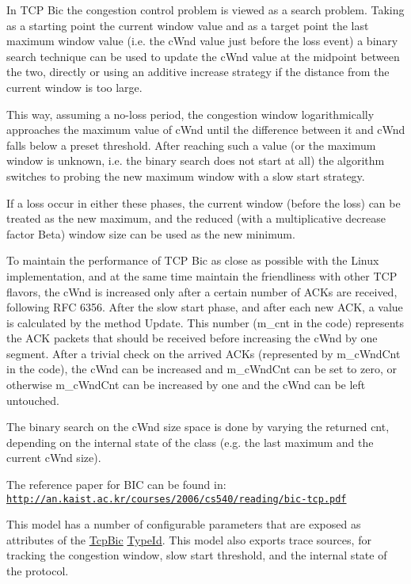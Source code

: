In T\+CP Bic the congestion control problem is viewed as a search problem. Taking as a starting point the current window value and as a target point the last maximum window value (i.\+e. the c\+Wnd value just before the loss event) a binary search technique can be used to update the c\+Wnd value at the midpoint between the two, directly or using an additive increase strategy if the distance from the current window is too large.

This way, assuming a no-\/loss period, the congestion window logarithmically approaches the maximum value of c\+Wnd until the difference between it and c\+Wnd falls below a preset threshold. After reaching such a value (or the maximum window is unknown, i.\+e. the binary search does not start at all) the algorithm switches to probing the new maximum window with a \textquotesingle{}slow start\textquotesingle{} strategy.

If a loss occur in either these phases, the current window (before the loss) can be treated as the new maximum, and the reduced (with a multiplicative decrease factor Beta) window size can be used as the new minimum.

To maintain the performance of T\+CP Bic as close as possible with the Linux implementation, and at the same time maintain the friendliness with other T\+CP flavors, the c\+Wnd is increased only after a certain number of A\+C\+Ks are received, following R\+FC 6356. After the slow start phase, and after each new A\+CK, a value is calculated by the method Update. This number (m\+\_\+cnt in the code) represents the A\+CK packets that should be received before increasing the c\+Wnd by one segment. After a trivial check on the arrived A\+C\+Ks (represented by m\+\_\+c\+Wnd\+Cnt in the code), the c\+Wnd can be increased and m\+\_\+c\+Wnd\+Cnt can be set to zero, or otherwise m\+\_\+c\+Wnd\+Cnt can be increased by one and the c\+Wnd can be left untouched.

The binary search on the c\+Wnd size space is done by varying the returned cnt, depending on the internal state of the class (e.\+g. the last maximum and the current c\+Wnd size).

The reference paper for B\+IC can be found in\+: \href{http://an.kaist.ac.kr/courses/2006/cs540/reading/bic-tcp.pdf}{\tt http\+://an.\+kaist.\+ac.\+kr/courses/2006/cs540/reading/bic-\/tcp.\+pdf}

This model has a number of configurable parameters that are exposed as attributes of the \hyperlink{classns3_1_1TcpBic}{Tcp\+Bic} \hyperlink{classns3_1_1TypeId}{Type\+Id}. This model also exports trace sources, for tracking the congestion window, slow start threshold, and the internal state of the protocol.

